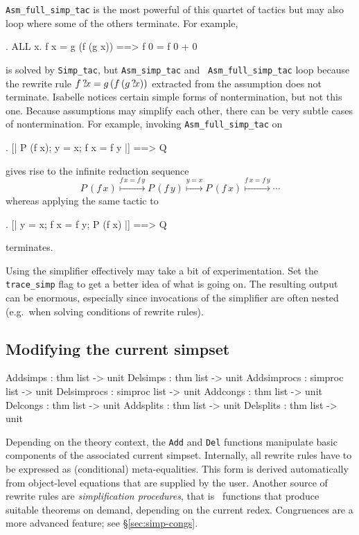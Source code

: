 \medskip \texttt{Asm_full_simp_tac} is the most powerful of this quartet
of tactics but may also loop where some of the others terminate.  For
example,
\begin{ttbox}
{. ALL x. f x = g (f (g x)) ==> f 0 = f 0 + 0}
\end{ttbox}
is solved by \texttt{Simp_tac}, but \texttt{Asm_simp_tac} and {\tt
  Asm_full_simp_tac} loop because the rewrite rule $f\,{?\!x} =
g\,(f\,(g\,{?\!x}))$ extracted from the assumption does not
terminate.  Isabelle notices certain simple forms of nontermination,
but not this one. Because assumptions may simplify each other, there can be
very subtle cases of nontermination. For example, invoking
{\tt Asm_full_simp_tac} on
\begin{ttbox}
{. [| P (f x); y = x; f x = f y |] ==> Q}
\end{ttbox}
gives rise to the infinite reduction sequence
\[
P\,(f\,x) \stackrel{f\,x = f\,y}{\longmapsto} P\,(f\,y) \stackrel{y = x}{\longmapsto}
P\,(f\,x) \stackrel{f\,x = f\,y}{\longmapsto} \cdots
\]
whereas applying the same tactic to
\begin{ttbox}
{. [| y = x; f x = f y; P (f x) |] ==> Q}
\end{ttbox}
terminates.

\medskip

Using the simplifier effectively may take a bit of experimentation.
Set the \verb$trace_simp$ flag to get
a better idea of what is going on.  The resulting output can be
enormous, especially since invocations of the simplifier are often
nested (e.g.\ when solving conditions of rewrite rules).


\subsection{Modifying the current simpset}
\begin{ttbox}
Addsimps    : thm list -> unit
Delsimps    : thm list -> unit
Addsimprocs : simproc list -> unit
Delsimprocs : simproc list -> unit
Addcongs    : thm list -> unit
Delcongs    : thm list -> unit
Addsplits   : thm list -> unit
Delsplits   : thm list -> unit
\end{ttbox}

Depending on the theory context, the \texttt{Add} and \texttt{Del}
functions manipulate basic components of the associated current
simpset.  Internally, all rewrite rules have to be expressed as
(conditional) meta-equalities.  This form is derived automatically
from object-level equations that are supplied by the user.  Another
source of rewrite rules are \emph{simplification procedures}, that is
\ML\ functions that produce suitable theorems on demand, depending on
the current redex.  Congruences are a more advanced feature; see
{\S}\ref{sec:simp-congs}.

